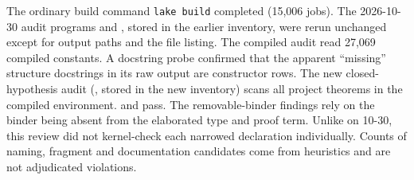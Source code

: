 \documentclass[11pt,a4paper]{article}
\begin{document}
The ordinary build command \texttt{lake build} completed (15{,}006 jobs). The 2026-10-30 audit
programs  and , stored in the earlier
inventory, were rerun unchanged except for output paths and the file listing. The compiled
audit read 27{,}069 compiled constants. A docstring probe confirmed that the
apparent ``missing'' structure docstrings in its raw output are constructor rows. The new
closed-hypothesis audit (, stored in the new inventory) scans all
project theorems in the compiled environment.  and
 pass. The removable-binder findings rely on the binder
being absent from the elaborated type and proof term. Unlike on 10-30, this review did not
kernel-check each narrowed declaration individually. Counts of naming, fragment and
documentation candidates come from heuristics and are not adjudicated violations.
\end{document}
